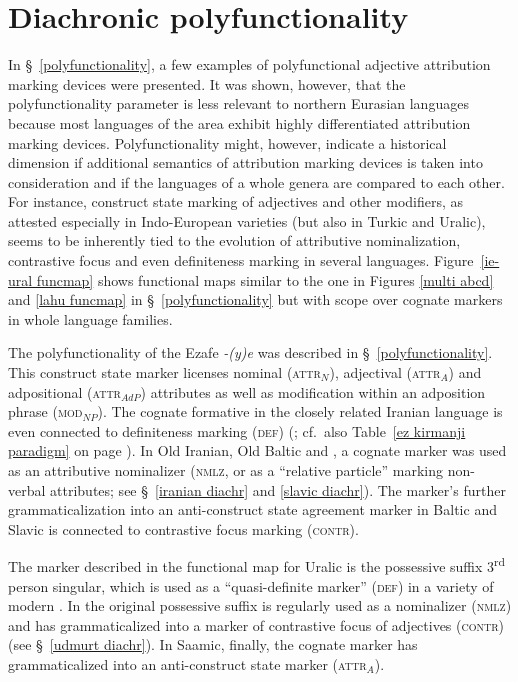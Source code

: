 {\section{Diachronic polyfunctionality}
In \S~\ref{polyfunctionality}, a few examples of polyfunctional adjective attribution marking devices were presented. It was shown, however, that the polyfunctionality parameter is less relevant to northern Eurasian languages because most languages of the area exhibit highly differentiated attribution marking devices. Polyfunctionality might, however, indicate a historical dimension if additional semantics of attribution marking devices is taken into consideration and if the languages of a whole genera are compared to each other. For instance, construct state marking of adjectives and other modifiers, as attested especially in Indo-European varieties (but also in Turkic and Uralic), seems to be inherently tied to the evolution of attributive nominalization, contrastive focus and even definiteness marking in several languages. Figure~\ref{ie-ural funcmap} shows functional maps similar to the one in Figures \ref{multi abcd} and \ref{lahu funcmap} in \S~\ref{polyfunctionality} but with scope over cognate markers in whole language families.

The polyfunctionality of the  Ezafe \textit{-(y)e} was described in \S~\ref{polyfunctionality}. This construct state marker licenses nominal (\textsc{attr}$_{N}$), adjectival (\textsc{attr}$_{A}$) and adpositional (\textsc{attr}$_{AdP}$) attributes as well as modification within an adposition phrase (\textsc{mod}$_{NP}$). The cognate formative in the closely related Iranian language  is even connected to definiteness marking (\textsc{def}) (\citealt{schroder2002}; cf.~also Table~\ref{ez kirmanji paradigm} on page \pageref{ez kirmanji paradigm}). In Old Iranian, Old Baltic and , a cognate marker was used as an attributive nominalizer (\textsc{nmlz}, or as a “relative particle” marking non-verbal attributes; see \S~\ref{iranian diachr} and \ref{slavic diachr}). The marker's further grammaticalization into an anti-construct state agreement marker in Baltic and Slavic is connected to contrastive focus marking (\textsc{contr}).

The marker described in the functional map for Uralic is the possessive suffix 3\textsuperscript{rd} person singular, which is used as a “quasi-definite marker” (\textsc{def}) in a variety of modern . In  the original possessive suffix is regularly used as a nominalizer (\textsc{nmlz}) and has grammaticalized into a marker of contrastive focus of adjectives (\textsc{contr}) (see \S~\ref{udmurt diachr}). In Saamic, finally, the cognate marker has grammaticalized into an anti-construct state marker (\textsc{attr}$_{A}$).

}
